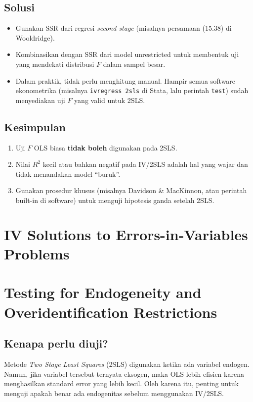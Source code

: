 \documentclass[]{article}
\begin{document}
\subsection*{Solusi}
\begin{itemize}
  \item Gunakan SSR dari regresi \emph{second stage} (misalnya persamaan (15.38) di Wooldridge).
  \item Kombinasikan dengan SSR dari model unrestricted untuk membentuk uji yang
        mendekati distribusi $F$ dalam sampel besar.
  \item Dalam praktik, tidak perlu menghitung manual. Hampir semua software ekonometrika 
        (misalnya \texttt{ivregress 2sls} di Stata, lalu perintah \texttt{test}) sudah menyediakan
        uji $F$ yang valid untuk 2SLS.
\end{itemize}

\subsection*{Kesimpulan}
\begin{enumerate}
  \item Uji $F$ OLS biasa \textbf{tidak boleh} digunakan pada 2SLS.
  \item Nilai $R^2$ kecil atau bahkan negatif pada IV/2SLS adalah hal yang wajar 
        dan tidak menandakan model ``buruk''.
  \item Gunakan prosedur khusus (misalnya Davidson \& MacKinnon, atau perintah built-in di software) 
        untuk menguji hipotesis ganda setelah 2SLS.
\end{enumerate}


\section{IV Solutions to Errors-in-Variables Problems}
 


\section{Testing for Endogeneity and Overidentification Restrictions}

\subsection*{Kenapa perlu diuji?}
Metode \textit{Two Stage Least Squares} (2SLS) digunakan ketika ada variabel endogen. 
Namun, jika variabel tersebut ternyata eksogen, maka OLS lebih efisien karena menghasilkan standard error yang lebih kecil. 
Oleh karena itu, penting untuk menguji apakah benar ada endogenitas sebelum menggunakan IV/2SLS.
\end{document}
